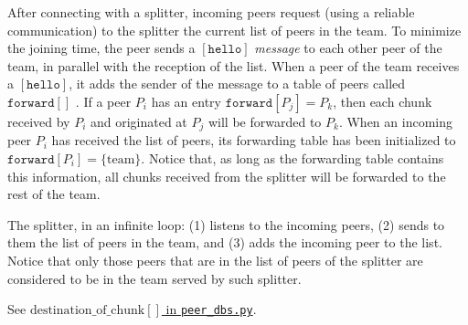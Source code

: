 
\label{sec:joining}

After connecting with a splitter, incoming peers request (using a
reliable communication) to the splitter the current list of peers in
the team. To minimize the joining time, the peer sends a
$[\mathtt{hello}]$ \emph{message} to each other peer of the team, in
parallel with the reception of the list. When a peer of the team
receives a $[\mathtt{hello}]$, it adds the sender of the message to a
table of peers called $\mathtt{forward}[]$ . If a peer $P_i$ has an entry
$\mathtt{forward}[P_j]=P_k$, then each chunk received by $P_i$ and
originated at $P_j$ will be forwarded to $P_k$. When an incoming peer
$P_i$ has received the list of peers, its forwarding table has been
initialized to $\mathtt{forward}[P_i]=\{\text{team}\}$. Notice that,
as long as the forwarding table contains this information, all chunks
received from the splitter will be forwarded to the rest of the team.


The splitter, in an infinite loop: (1) listens to the incoming peers,
(2) sends to them the list of peers in the team, and (3) adds the
incoming peer to the list. Notice that only those peers that are in
the list of peers of the splitter are considered to be in the team
served by such splitter.

\begin{comment}
\begin{figure*}
  \fig{1000}{10cm}{joining} \caption{Code related to team
    joining.\label{fig:joining}}
\end{figure*}

The new pseudo-code related to joining a team is describen in the
Fig.~\ref{fig:joining}.
\end{comment}

\begin{notex}
  See \href{https://github.com/P2PSP/simulator/blob/f0c73be1817e7d3b816cc61cd2c8e59b17f9a0e6/src/core/splitter_dbs.py#L296}{$\text{destination\_of\_chunk}[]$ in \texttt{peer\_dbs.py}}.
\end{notex}
